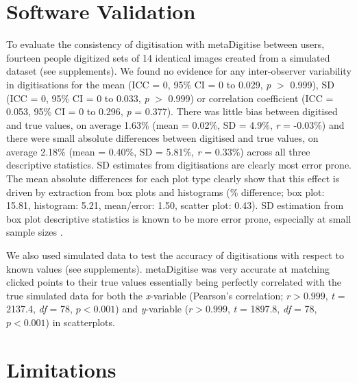 \documentclass[12pt]{article}
\newcommand{\pkg}[1]{{\fontseries{b}\selectfont #1}}
\begin{document}
\section{Software Validation}
To evaluate the consistency of digitisation with \pkg{metaDigitise} between users, fourteen people digitized sets of 14 identical images created from a simulated dataset (see supplements). We found no evidence for any inter-observer variability in digitisations for the mean (ICC = 0, 95\% CI = 0 to 0.029, \textit{p} $>$ 0.999), SD (ICC = 0, 95\% CI = 0 to 0.033, \textit{p} $>$ 0.999) or correlation coefficient (ICC = 0.053, 95\% CI = 0 to 0.296, \textit{p} = 0.377). There was little bias between digitised and true values, on average 1.63\% (mean = 0.02\%, SD = 4.9\%, \textit{r} = -0.03\%) and there were small absolute differences between digitised and true values, on average 2.18\% (mean = 0.40\%, SD = 5.81\%, \textit{r} = 0.33\%) across all three descriptive statistics. SD estimates from digitisations are clearly most error prone. The mean absolute differences for each plot type clearly show that this effect is driven by extraction from box plots and histograms (\% difference; box plot: 15.81, histogram: 5.21, mean/error: 1.50, scatter plot: 0.43). SD estimation from box plot descriptive statistics is known to be more error prone, especially at small sample sizes \citep{Wan2014}. 

We also used simulated data to test the accuracy of digitisations with respect to known values (see supplements). \pkg{metaDigitise} was very accurate at matching clicked points to their true values essentially being perfectly correlated with the true simulated data for both the \textit{x}-variable (Pearson's correlation; $r > 0.999$, \textit{t} = 2137.4, \textit{df} = 78, $p < 0.001$) and \textit{y}-variable ($r > 0.999$, \textit{t} = 1897.8, \textit{df} = 78, $p < 0.001$) in scatterplots.






\section{Limitations}
\end{document}
